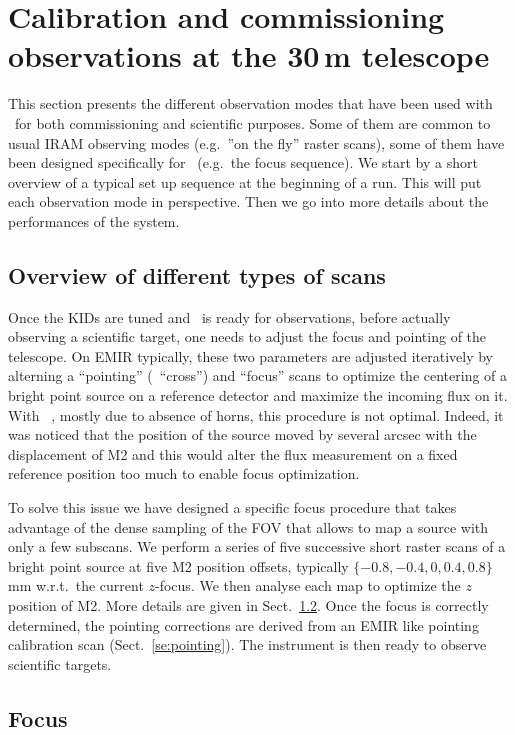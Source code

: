 
\section{Calibration and commissioning observations at the 30\,m telescope}%

This section presents the different observation modes that have been used with
\nika\ for both commissioning and scientific purposes. Some of them are common
to usual IRAM observing modes (e.g.~''on the fly'' raster scans), some of them
have been designed specifically for \nika\ (e.g.~the focus sequence). We start
by a short overview of a typical set up sequence at the beginning of a run. This
will put each observation mode in perspective. Then we go into more details
about the performances of the system.

\subsection{Overview of different types of scans}

Once the KIDs are tuned and \nika\ is ready for observations, before actually
observing a scientific target, one needs to adjust the focus and pointing of the
telescope. On EMIR typically, these two parameters are adjusted iteratively by
alterning a ``pointing'' (\aka\ ``cross'') and ``focus'' scans to optimize the
centering of a bright point source on a reference detector and maximize the
incoming flux on it. With \nika\ , mostly due to absence of horns, this
procedure is not optimal. Indeed, it was noticed that the position of the source
moved by several arcsec with the displacement of M2 and this would alter the flux
measurement on a fixed reference position too much to enable focus
optimization.

To solve this issue we have designed a specific focus procedure that takes
advantage of the dense sampling of the FOV that allows to map a source with only
a few subscans. We perform a series of five successive short raster scans of a
bright point source at five M2 position offsets, typically
$\{-0.8, -0.4, 0, 0.4, 0.8\}$\,mm w.r.t.~the current $z$-focus.
We then analyse each map to
optimize the $z$ position of M2. More details are given in
Sect.~\ref{se:axial_focus}.
Once the focus is correctly determined, the pointing
corrections are derived from an EMIR like pointing calibration scan
(Sect.~\ref{se:pointing}). The instrument is then ready to observe scientific
targets.

\subsection{Focus}
\label{se:axial_focus}

